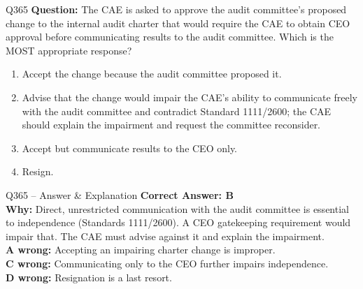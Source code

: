 \documentclass[aspectratio=169,10pt]{beamer}
\begin{document}
	\begin{frame}[t]{Q365}
		\small
		\textbf{Question:} The CAE is asked to approve the audit committee's proposed change to the internal audit charter that would require the CAE to obtain CEO approval before communicating results to the audit committee. Which is the MOST appropriate response?
		\begin{enumerate}[label=\Alph*.,itemsep=1pt,topsep=2pt]
			\item Accept the change because the audit committee proposed it.
			\item Advise that the change would impair the CAE's ability to communicate freely with the audit committee and contradict Standard 1111/2600; the CAE should explain the impairment and request the committee reconsider.
			\item Accept but communicate results to the CEO only.
			\item Resign.
		\end{enumerate}
	\end{frame}
	
	\begin{frame}[t]{Q365 -- Answer \& Explanation}
		\small
		\textbf{Correct Answer: B} \\[4pt]
		\textbf{Why:} Direct, unrestricted communication with the audit committee is essential to independence (Standards 1111/2600). A CEO gatekeeping requirement would impair that. The CAE must advise against it and explain the impairment. \\[4pt]
		\textbf{A wrong:} Accepting an impairing charter change is improper. \\[2pt]
		\textbf{C wrong:} Communicating only to the CEO further impairs independence. \\[2pt]
		\textbf{D wrong:} Resignation is a last resort.
	\end{frame}
	
\end{document}

